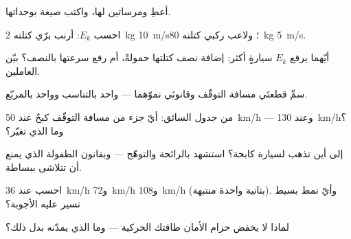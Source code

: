 \begin{exercise}[$\star$]\label{exo:g9:kinetic-energy-safety:1}
أعطِ   ومرساتين لها، واكتب صيغة 
بوحداتها.
\end{exercise}

\begin{exercise}[$\star$]\label{exo:g9:kinetic-energy-safety:2}
احسب $E_k$: أرنب برّي كتلته \qty{2}{kg}  \qty{10}{m/s}؛
ولاعب ركبي كتلته \qty{80}{kg}  \qty{5}{m/s}.
\end{exercise}

\begin{exercise}[$\star$]\label{exo:g9:kinetic-energy-safety:3}
أيّهما يرفع $E_k$ سيارةٍ أكثر: إضافة نصف كتلتها حمولةً، أم رفع
سرعتها بالنصف؟ بيّن العاملين.
\end{exercise}

\begin{exercise}[$\star$]\label{exo:g9:kinetic-energy-safety:4}
سمِّ قطعتَي مسافة التوقّف وقانونَي نموّهما --- واحد بالتناسب
وواحد بالمربّع.
\end{exercise}

\begin{exercise}[$\star$]\label{exo:g9:kinetic-energy-safety:5}
من جدول السائق: أيّ جزء من مسافة التوقّف كبحٌ عند
\qty{50}{km/h} --- وعند \qty{130}{km/h}؟ وما الذي تغيّر؟
\end{exercise}

\begin{exercise}[$\star$]\label{exo:g9:kinetic-energy-safety:6}
إلى أين تذهب  لسيارة كابحة؟ استشهد بالرائحة
والتوهّج --- وبقانون الطفولة الذي يمنع أن تتلاشى ببساطة.
\end{exercise}

\begin{exercise}[$\star$]\label{exo:g9:kinetic-energy-safety:7}
احسب  عند \qty{36}{km/h} و\qty{72}{km/h}
و\qty{108}{km/h} (بثانية واحدة منتبهة). وأيّ نمط بسيط تسير
عليه الأجوبة؟
\end{exercise}

\begin{exercise}[$\star$]\label{exo:g9:kinetic-energy-safety:8}
لماذا لا يخفض حزام الأمان طاقتك الحركية --- وما الذي يمدّنه
بدل ذلك؟
\end{exercise}

